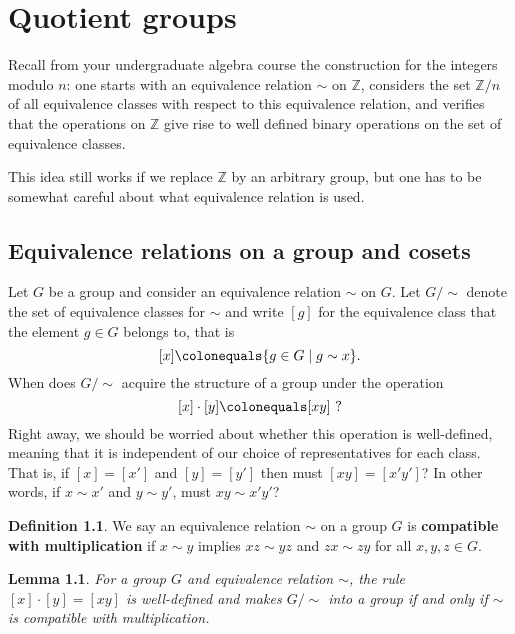 \documentclass[12pt]{report}
\newtheorem{lemma}[theorem]{Lemma}
\numberwithin{equation}{section}
\numberwithin{theorem}{chapter}
\theoremstyle{definition}
\newtheorem{definition}[theorem]{Definition}
\newtheorem*{basic properties}{Basic Properties}
\newtheorem*{Important Remark}{Important Remark}
\begin{document}
\chapter{Quotient groups}

Recall from your undergraduate algebra course the construction for the integers modulo $n$: one starts with an equivalence relation $\sim$ on $\mathbb{Z}$, considers the set $\mathbb{Z}/n$ of all equivalence classes with respect to this equivalence relation, and verifies that the operations on $\mathbb{Z}$ give rise to well defined binary operations on the set of equivalence classes. 

This idea still works if we replace $\mathbb{Z}$ by an arbitrary group, but one has to be somewhat careful about what equivalence relation is used. 

\section{Equivalence relations on a group and cosets}
 
Let $G$ be a group and consider an equivalence relation $\sim$ on $G$.
Let $G/\sim$ denote the set of equivalence classes for $\sim$ and write $[g]$ for the equivalence class that the element $g \in G$ belongs to, that is
$$[x] \colonequals \{g \in G \mid g \sim x\}.$$
When does $G/\sim$ acquire the structure of a group under the operation
$$[x] \cdot [y] \colonequals [xy] \ ?$$
Right away, we should be worried about whether this operation is well-defined, meaning that it is independent of our choice of representatives for each class. That is, if $[x] = [x']$ and $[y] = [y']$  then must $[xy] = [x'y']$? In other words, if $x \sim x'$ and $y \sim y'$, must $xy \sim x'y'$? 


\begin{definition}
We say an equivalence relation $\sim$ on a group $G$ is {\bf compatible with multiplication} if $x \sim y$ implies $xz \sim yz$ and $zx \sim zy$ for all $x,y,z \in G$.
 \end{definition}

\begin{lemma}\label{quotient group operation well-defined}
For a group $G$ and equivalence relation $\sim$, the rule $[x] \cdot [y] = [xy]$ is well-defined and makes $G/\sim$ into a group if and only if $\sim$ is compatible with multiplication.
\end{lemma}
\end{document}
